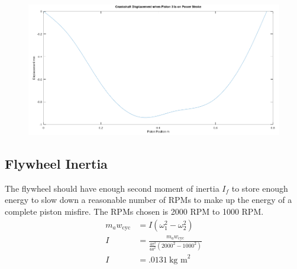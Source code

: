 \documentclass[10pt,a4paper]{article}
\begin{document}
	\begin{figure}[h]
		\centering
		\includegraphics[width=\textwidth]{csd.png}
	\end{figure}
	\newpage
\subsection*{Flywheel Inertia}
The flywheel should have enough second moment of inertia $I_f$ to store enough energy to slow down a reasonable number of RPMs to make up the energy of a complete piston misfire. The RPMs chosen is 2000 RPM to 1000 RPM.
\newpage
\begin{align*}
	m_a w_{\text{cyc}} &= I(\omega_1^2 - \omega_2^2)\\
	I &= \frac{m_a w_{\text{cyc}}}{\frac{4 \pi^2}{60^2}(2000^2-1000^2)}\\
	I &= .0131\ \text{kg m}^2
\end{align*}
\newpage
\end{document}
